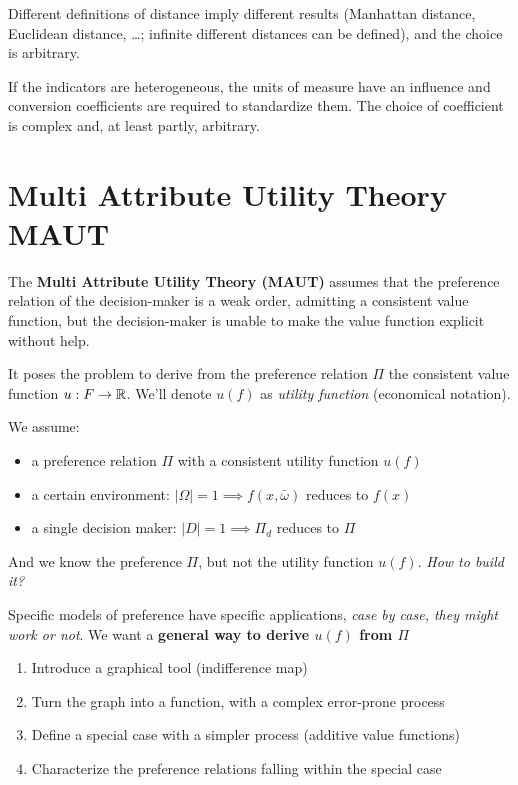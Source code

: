 Different definitions of distance imply different results (Manhattan distance, Euclidean distance, \dots; infinite different distances can be defined), and the choice is arbitrary. 

If the indicators are heterogeneous, the units of measure have an influence and conversion coefficients are required to standardize them. The choice of coefficient is complex and, at least partly, arbitrary.


\section{Multi Attribute Utility Theory MAUT}
\label{sec:maut}

The \textbf{Multi Attribute Utility Theory (MAUT)} assumes that the preference relation of the decision-maker is a weak order, admitting a consistent value function, but the decision-maker is unable to make the value function explicit without help.

It poses the problem to derive from the preference relation $\Pi$ the consistent value function $u: F \rightarrow \operatorname{\mathbb{R}}$. We'll denote $u(f)$ as \textit{utility function} (economical notation).

We assume: 
\begin{itemize}
	\item a preference relation $\Pi$ with a consistent utility function $u(f)$ 
	
	\item a certain environment: $|\Omega| = 1 \implies f(x, \bar \omega)$ reduces to $f(x)$
	
	\item a single decision maker: $|D| = 1 \implies \Pi_d$ reduces to $\Pi$
\end{itemize}

And we know the preference $\Pi$, but not the utility function $u(f)$. \textit{How to build it?}

Specific models of preference have specific applications, \textit{case by case, they might work or not}. We want a \textbf{general way to derive $u(f)$ from $\Pi$}
\begin{enumerate}
	\item Introduce a graphical tool (indifference map)
	
	\item Turn the graph into a function, with a complex error-prone process 
	
	\item Define a special case with a simpler process (additive value functions)
	
	\item Characterize the preference relations falling within the special case
\end{enumerate}


